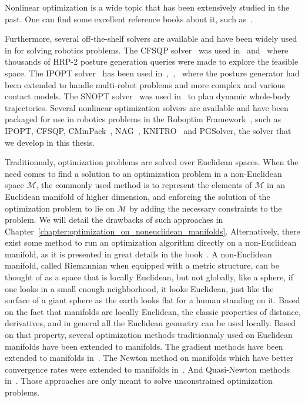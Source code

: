 Nonlinear optimization is a wide topic that has been extensively studied in the past.
One can find some excellent reference books about it, such as~\cite{nocedal:book:2006, bonnans:book:2003, boyd2004convex}.

Furthermore, several off-the-shelf solvers are available and have been widely used in for solving robotics problems.
The CFSQP solver~\cite{cfsqp:manual} was used in~\cite{escande:iros:2009} and~\cite{escande:ras:2013} where thousands of HRP-2 posture generation queries were made to explore the feasible space.
The IPOPT solver~\cite{wachter:mathprog:2006} has been used in~\cite{vaillant:humanoids:2014},~\cite{vaillant:autonomousrobots:2016},~\cite{bouyarmane:ar:2012} where the posture generator had been extended to handle multi-robot problems and more complex and various contact models.
The SNOPT solver~\cite{gill2005snopt} was used in~\cite{dai2014whole} to plan dynamic whole-body trajectories.
Several nonlinear optimization solvers are available and have been packaged for use in robotics problems in the Roboptim Framework~\cite{moulard:jsme:2013}, such as IPOPT, CFSQP, CMinPack~\cite{cminpack}, NAG~\cite{nag}, KNITRO~\cite{knitro} and PGSolver, the solver that we develop in this thesis.

Traditionnaly, optimization problems are solved over Euclidean spaces.
When the need comes to find a solution to an optimization problem in a non-Euclidean space $\mathcal{M}$, the commonly used method is to represent the elements of $\mathcal{M}$ in an Euclidean manifold of higher dimension, and enforcing the solution of the optimization problem to lie on $\mathcal{M}$ by adding the necessary constraints to the problem.
We will detail the drawbacks of such approaches in Chapter~\ref{chapter:optimization_on_noneuclidean_manifolds}.
Alternatively, there exist some method to run an optimization algorithm directly on a non-Euclidean manifold, as it is presented in great details in the book~\cite{absil:book:2008}.
A non-Euclidean manifold, called Riemannian when equipped with a metric structure, can be thought of as a space that is locally Euclidean, but not globally, like a sphere, if one looks in a small enough neighborhood, it looks Euclidean, just like the surface of a giant sphere as the earth looks flat for a human standing on it.
Based on the fact that manifolds are locally Euclidean, the classic properties of distance, derivatives, and in general all the Euclidean geometry can be used locally.
Based on that property, several optimization methods traditionnaly used on Euclidean manifolds have been extended to manifolds.
The gradient methods have been extended to manifolds in~\cite{luenberger1972gradient, gabay1982minimizing}.
The Newton method on manifolds which have better convergence rates were extended to manifolds in~\cite{gabay1982minimizing, stuart1998dynamical, smith2013geometric}.
And Quasi-Newton methods in~\cite{gabay1982minimizing}.
Those approaches are only meant to solve unconstrained optimization problems.

